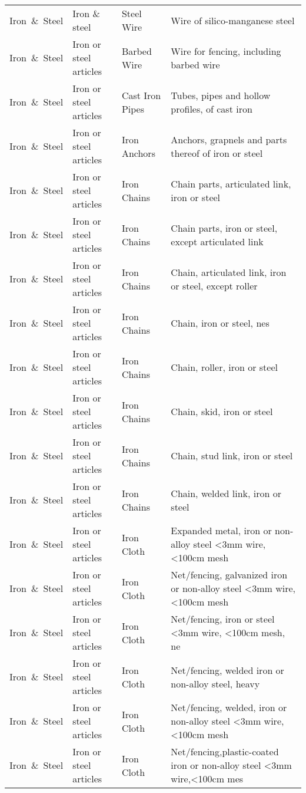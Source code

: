 \begin{appendices}
\begin{xltabular}{\textwidth}{|p{0.07\textwidth}|p{0.12\textwidth}|p{0.20\textwidth}|p{0.5\textwidth}|}
Iron\ \&\ Steel & Iron \& steel & Steel Wire & Wire of silico-manganese steel \\
Iron\ \&\ Steel & Iron or steel articles & Barbed Wire & Wire for fencing, including barbed wire \\
Iron\ \&\ Steel & Iron or steel articles & Cast Iron Pipes & Tubes, pipes and hollow profiles, of cast iron \\
Iron\ \&\ Steel & Iron or steel articles & Iron Anchors & Anchors, grapnels and parts thereof of iron or steel \\
Iron\ \&\ Steel & Iron or steel articles & Iron Chains & Chain parts, articulated link, iron or steel \\
Iron\ \&\ Steel & Iron or steel articles & Iron Chains & Chain parts, iron or steel, except articulated link \\
Iron\ \&\ Steel & Iron or steel articles & Iron Chains & Chain, articulated link, iron or steel, except roller \\
Iron\ \&\ Steel & Iron or steel articles & Iron Chains & Chain, iron or steel, nes \\
Iron\ \&\ Steel & Iron or steel articles & Iron Chains & Chain, roller, iron or steel \\
Iron\ \&\ Steel & Iron or steel articles & Iron Chains & Chain, skid, iron or steel \\
Iron\ \&\ Steel & Iron or steel articles & Iron Chains & Chain, stud link, iron or steel \\
Iron\ \&\ Steel & Iron or steel articles & Iron Chains & Chain, welded link, iron or steel \\
Iron\ \&\ Steel & Iron or steel articles & Iron Cloth & Expanded metal, iron or non-alloy steel <3mm wire, <100cm mesh \\
Iron\ \&\ Steel & Iron or steel articles & Iron Cloth & Net/fencing, galvanized iron or non-alloy steel <3mm wire, <100cm mesh \\
Iron\ \&\ Steel & Iron or steel articles & Iron Cloth & Net/fencing, iron or steel <3mm wire, <100cm mesh, ne \\
Iron\ \&\ Steel & Iron or steel articles & Iron Cloth & Net/fencing, welded iron or non-alloy steel, heavy \\
Iron\ \&\ Steel & Iron or steel articles & Iron Cloth & Net/fencing, welded, iron or non-alloy steel <3mm wire, <100cm mesh \\
Iron\ \&\ Steel & Iron or steel articles & Iron Cloth & Net/fencing,plastic-coated iron or non-alloy steel <3mm wire,<100cm mes \\

\end{xltabular}
\end{appendices}
